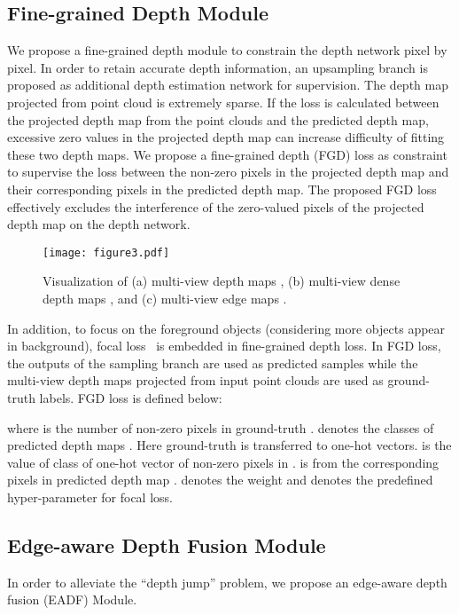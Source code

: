 \documentclass[letterpaper]{article} \usepackage[submission]{aaai24}  \usepackage{times}  \usepackage{helvet}  \usepackage{courier}  \usepackage[hyphens]{url}  \usepackage{graphicx} \urlstyle{rm} \def\UrlFont{\rm}  \usepackage{natbib}  \usepackage{caption} \frenchspacing  \setlength{\pdfpagewidth}{8.5in} \setlength{\pdfpageheight}{11in} \usepackage{algorithm}
\begin{document}
\subsection{Fine-grained Depth Module}\label{subsection:FGD}
We propose a fine-grained depth module to constrain the depth network pixel by pixel. 
In order to retain accurate depth information, an upsampling branch is proposed as additional depth estimation network for supervision. 
The depth map projected from point cloud is extremely sparse. If the loss is calculated between the projected depth map from the point clouds and the predicted depth map, excessive zero values in the projected depth map can increase difficulty of fitting these two depth maps. We propose a fine-grained depth (FGD) loss as constraint to supervise the loss between the non-zero pixels in the projected depth map and their corresponding pixels in the predicted depth map. The proposed FGD loss effectively excludes the interference of the zero-valued pixels of the projected depth map on the depth network. 
\begin{figure}[t]
\begin{center}
\texttt{[image: figure3.pdf]}
\end{center}
   \caption{Visualization of (a) multi-view depth maps , (b) multi-view dense depth maps , and (c) multi-view edge maps . }
\label{fig:depth_map}
\end{figure}


In addition, to focus on the foreground objects (considering more objects appear in background), focal loss~\cite{focalloss} is embedded in fine-grained depth loss. In FGD loss, the outputs of the sampling branch  are used as predicted samples while the multi-view depth maps  projected from input point clouds are used as ground-truth labels.  FGD loss is defined below:

where  is the number of non-zero pixels in ground-truth .  denotes the classes of predicted depth maps . Here ground-truth  is transferred to one-hot vectors.  is the value of  class of  one-hot vector of non-zero pixels in .   is from the corresponding pixels in predicted depth map .
 denotes the weight and   denotes the predefined hyper-parameter for focal loss.



\subsection{Edge-aware Depth Fusion Module}
In order to alleviate the ``depth jump'' problem, we propose an edge-aware depth fusion (EADF) Module.
\end{document}
